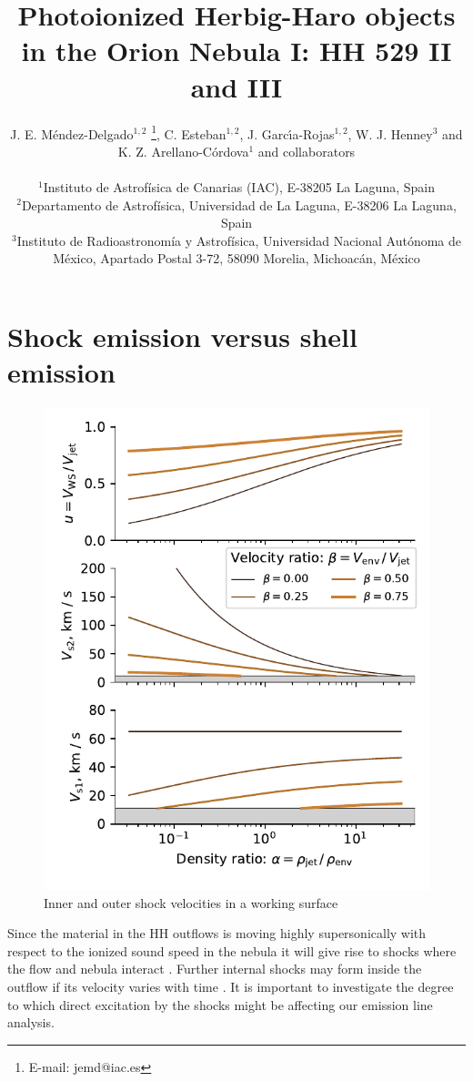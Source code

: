 \documentclass[useAMS, usenatbib]{mnras}
\title[HH 529 II and III in the Orion Nebula]{
  Photoionized Herbig-Haro objects in the Orion Nebula I: HH 529 II and III
}
\author[J. E. M\'endez-Delgado et al.]
{J. E. M\'endez-Delgado$^{1,2}$ \thanks{E-mail: jemd@iac.es},
  C. Esteban$^{1,2}$, J. Garc{\'{\i}}a-Rojas$^{1,2}$, W. J. Henney$^{3}$  
  \newauthor 
  and K. Z. Arellano-C\'ordova$^{1}$ and collaborators\\
\\
$^{1}$Instituto de Astrof\'isica de Canarias (IAC), E-38205 La Laguna, Spain\\
$^{2}$Departamento de Astrof\'isica, Universidad de La Laguna, E-38206 La Laguna, Spain\\
$^{3}$Instituto de Radioastronom\'ia y Astrof\'isica, Universidad Nacional Aut\'onoma de M\'exico, Apartado Postal 3-72, 58090 Morelia, Michoac\'an, M\'exico}
\begin{document}
\begin{table}
  \setcounter{table}{3}\caption{}\label{tab:pc}
  \setcounter{table}{12}\caption{}\label{tab:total_abundances_rls}
\end{table}

\section{Shock emission versus shell emission}
\label{sec:shoc-v-shell}

\begin{figure}
  \centering
  \includegraphics[width=\linewidth]{shock-velocities}
  \caption{Inner and outer shock velocities in a working surface}
  \label{fig:shock-velocities}
\end{figure}

\newcommand\Mach{\ensuremath{\mathcal{M}}}
\newcommand\shock{\ensuremath{_{\mathrm{s}}}}
Since the material in the HH outflows is moving highly supersonically
with respect to the ionized sound speed in the nebula
it will give rise to shocks where the flow and nebula interact
\citep{Hartigan:1987a}.
Further internal shocks may form inside the outflow
if its velocity varies with time \citep{Raga:1990a}.
It is important to investigate the degree to which direct excitation by the shocks
might be affecting our emission line analysis.
\end{document}
